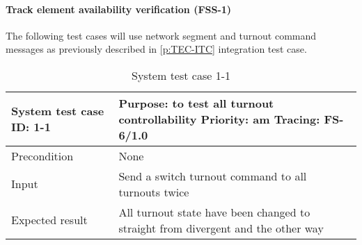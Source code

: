 \paragraph{Track element availability verification (FSS-1)} The following test cases will use network segment and turnout command messages as previously described in \autoref{p:TEC-ITC} integration test case. 
\begin{table}[H]
	\caption{System test case 1-1}
	\label{table:TCase-FSS1-01}
	\begin{center}
		\renewcommand{\arraystretch}{1.8}
		\begin{tabu} 
			to 0.9 \textwidth
			{  X[0.3, l] X[l] }
			\toprule
			System test case ID: 1-1 & Purpose: to test all turnout controllability     \newline Priority: am \newline Tracing: FS-6/1.0                                \\ \midrule
			Precondition                                                              & None                                                                            \\
			Input                                                                     & Send a switch turnout command to all turnouts twice                                \\
			Expected result                                                           & All turnout state have been changed to straight from divergent and the other way \\ \bottomrule
		\end{tabu}
	\end{center}
\end{table}


